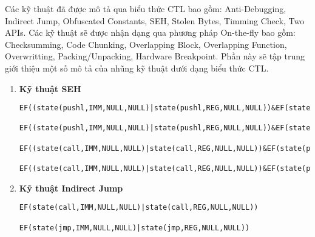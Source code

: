 \hspace{0.5cm}Các kỹ thuật đã được mô tả qua biểu thức CTL bao gồm: Anti-Debugging, Indirect Jump, Obfuscated Constants, SEH, Stolen Bytes, Timming Check, Two APIs. Các kỹ thuật sẽ được nhận dạng qua phương pháp On-the-fly bao gồm: Checksumming, Code Chunking, Overlapping Block, Overlapping Function, Overwritting, Packing/Unpacking, Hardware Breakpoint. Phần này sẽ tập trung giới thiệu một số mô tả của nhũng kỹ thuật dưới dạng biểu thức CTL.\\

\begin{enumerate}
\item{\textbf{Kỹ thuật SEH}
\begin{code}
\begin{lstlisting}[captionpos=b,caption={Mô tả CTL kỹ thuật SEH},label={lst:CTLSEH},frame=single,breaklines=true]
EF((state(pushl,IMM,NULL,NULL)|state(pushl,REG,NULL,NULL))&EF(state(pushl,s_fs$0$,NULL,NULL)&EF(state(movl,r_esp,s_fs$0$,NULL))))  

EF((state(pushl,IMM,NULL,NULL)|state(pushl,REG,NULL,NULL))&EF(state(pushl,s_fs$REG$,NULL,NULL)&EF(state(movl,r_esp,s_fs$REG$,NULL))))

EF((state(call,IMM,NULL,NULL)|state(call,REG,NULL,NULL))&EF(state(pushl,s_fs$0$,NULL,NULL)&EF(state(movl,r_esp,s_fs$0$,NULL))))

EF((state(call,IMM,NULL,NULL)|state(call,REG,NULL,NULL))&EF(state(pushl,s_fs$REG$,NULL,NULL)&EF(state(movl,r_esp,s_fs$REG$,NULL)))) 
\end{lstlisting}
\end{code}
}
\item{\textbf{Kỹ thuật Indirect Jump}
\begin{code}
\begin{lstlisting}[captionpos=b,caption={Mô tả CTL kỹ thuật Indirect Jump},label={lst:CTLIJ},frame=single,breaklines=true]
EF(state(call,IMM,NULL,NULL)|state(call,REG,NULL,NULL))

EF(state(jmp,IMM,NULL,NULL)|state(jmp,REG,NULL,NULL))


\end{lstlisting}
\end{code}}
\end{enumerate}
